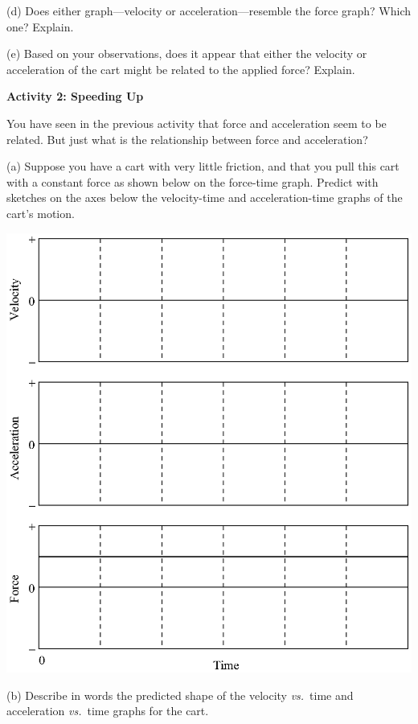 (d) Does either graph---velocity or acceleration---resemble the force graph? Which
one? Explain.
\answerspace{15mm}

(e) Based on your observations, does it appear that either the velocity or acceleration
of the cart might be related to the applied force? Explain.
\answerspace{15mm}

\pagebreak[3]
\textbf{Activity 2: Speeding Up }

You have seen in the previous activity that force and acceleration seem to be
related. But just what is the relationship between force and acceleration? 

(a) Suppose you have a cart with very little friction, and that you pull this
cart with a constant force as shown below on the force-time graph. Predict with sketches on
the axes below the velocity-time and acceleration-time graphs of the cart's motion.

\vspace{0.3cm}
{\par\centering \includegraphics{force1/force1_fig3.eps} \par}
\vspace{0.3cm}

(b) Describe in words the predicted shape of the velocity \textit{vs.}~time and acceleration
\textit{vs.}~time graphs for the cart.
\vspace{20mm}

